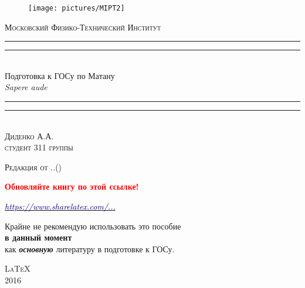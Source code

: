 \begin{titlepage}
\centering
\settowidth{\unitlength}{\LARGE\scshape Московский Физико-Технический Институт}

\begin{figure}[!h]
\center
\texttt{[image: pictures/MIPT2]}
\end{figure}
\vspace*{\baselineskip}
{\LARGE\scshape Московский Физико-Технический Институт}\\[\baselineskip]
\rule{\unitlength}{1.6pt}\vspace*{-\baselineskip}\vspace*{2pt}
\rule{\unitlength}{0.4pt}\\[1.8\baselineskip]
{\Huge Подготовка к ГОСу по Матану}\\[\baselineskip]
{\large \itshape Sapere aude}\\[0.7\baselineskip]
\rule{\unitlength}{0.4pt}\vspace*{-\baselineskip}\vspace{3.2pt}
\rule{\unitlength}{1.6pt}\\[\baselineskip]
{\Large\scshape Диденко А.А. \\ $ $\\студент 311 группы}\par
\vspace*{2\baselineskip}  




{\LARGE\scshape Редакция от \twodigit\day.\twodigit\month.\the\year \;(\currenttime)}\par %

\mbox{}

\textcolor{red}{\huge \textbf{Обновляйте книгу по этой ссылке!}}

\mbox{}

\href{https://www.sharelatex.com/github/repos/DidenkoAndre/GOS_book/builds/latest/output.pdf}{\large \textcolor{darkblue}{\textit{https://www.sharelatex.com/...}}}

\mbox{}

Крайне не рекомендую использовать это пособие\\ {\textbf{в данный момент}} \\как \textit{\textbf{основную}} литературу в подготовке к ГОСу. \\

\mbox{}

\vfill
{\LARGE\scshape \LaTeX}\\[\baselineskip]
{\LARGE\scshape 2016}\par
\restoregeometry
\end{titlepage}
